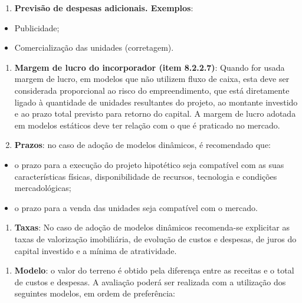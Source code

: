 \documentclass[
  10pt,
  a4paper]{article}
\providecommand{\tightlist}{%
  \setlength{\itemsep}{0pt}\setlength{\parskip}{0pt}}
\begin{document}
\begin{enumerate}
\def\labelenumi{\alph{enumi}.}
\setcounter{enumi}{5}
\tightlist
\item
  \textbf{Previsão de despesas adicionais. Exemplos}:
\end{enumerate}

\begin{itemize}
\tightlist
\item
  Publicidade;
\item
  Comercialização das unidades (corretagem).
\end{itemize}

\begin{enumerate}
\def\labelenumi{\alph{enumi}.}
\setcounter{enumi}{6}
\tightlist
\item
  \textbf{Margem de lucro do incorporador (item 8.2.2.7)}: Quando for
  usada margem de lucro, em modelos que não utilizem fluxo de caixa,
  esta deve ser considerada proporcional ao risco do empreendimento, que
  está diretamente ligado à quantidade de unidades resultantes do
  projeto, ao montante investido e ao prazo total previsto para retorno
  do capital. A margem de lucro adotada em modelos estáticos deve ter
  relação com o que é praticado no mercado.
\item
  \textbf{Prazos}: no caso de adoção de modelos dinâmicos, é recomendado
  que:
\end{enumerate}

\begin{itemize}
\tightlist
\item
  o prazo para a execução do projeto hipotético seja compatível com as
  suas características físicas, disponibilidade de recursos, tecnologia
  e condições mercadológicas;
\item
  o prazo para a venda das unidades seja compatível com o mercado.
\end{itemize}

\begin{enumerate}
\def\labelenumi{\roman{enumi}.}
\tightlist
\item
  \textbf{Taxas}: No caso de adoção de modelos dinâmicos recomenda-se
  explicitar as taxas de valorização imobiliária, de evolução de custos
  e despesas, de juros do capital investido e a mínima de atratividade.
\end{enumerate}

\begin{enumerate}
\def\labelenumi{\alph{enumi}.}
\setcounter{enumi}{9}
\tightlist
\item
  \textbf{Modelo}: o valor do terreno é obtido pela diferença entre as
  receitas e o total de custos e despesas. A avaliação poderá ser
  realizada com a utilização dos seguintes modelos, em ordem de
  preferência:
\end{enumerate}
\end{document}
